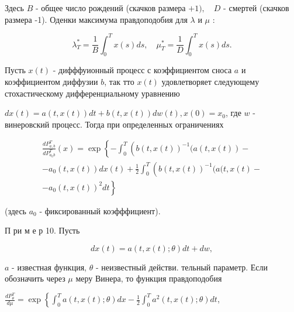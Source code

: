 \documentclass[10pt]{article}
\begin{document}
Здесь $B$ - общее число рождений (скачков размера $+1), \quad D$ - смертей (скачков размера -1). Оденки максимума правдоподобия для $\lambda$ и $\mu$ :



\[

\lambda_{T}^{*}=\frac{1}{B} \int_{0}^{T} x(s) d s, \quad \mu_{T}^{*}=\frac{1}{D} \int_{0}^{T} x(s) d s .

\]



Пусть $x(t)$ - дифффуионный процесс с коэффициентом сноса $a$ и коэффициентом диффузии $b$, так тто $x(t)$ удовлетворяет следующему стохастическому дифференциальному уравнению



$d x(t)=a(t, x(t)) d t+b(t, x(t)) d w(t), x(0)=x_{0}$, где $w$ - винеровский процесс. Тогда при определенных ограничениях



\[

\begin{gathered}

\frac{d P_{a, b}^{T}}{d P_{a_{0} b}^{T}}(x)=\exp \left\{-\int_{0}^{T}\left(b(t, x(t))^{-1}(a(t, x(t))-\right.\right. \\

-a_{0}(t, x(t)) d x(t)+\frac{1}{2} \int_{0}^{T}\left(b(t, x(t))^{-1}(a(t, x(t)-\right. \\

\left.-a_{0}(t, x(t))^{2} d t\right\}

\end{gathered}

\]



(здесь $a_{0}$ - фиксированный коэфффициент).



П ри м е р 10. Пусть



\[

d x(t)=a(t, x(t) ; \theta) d t+d w,

\]



$a$ - известная функция, $\theta$ - неизвестный действи. тельный параметр. Если обозначить через $\mu$ меру Винера, то функция правдоподобия



$\frac{d P_{\theta}^{T}}{d \mu}=\exp \left\{\int_{0}^{T} a(t, x(t) ; \theta) d x-\frac{1}{2} \int_{0}^{T} a^{2}(t, x(t) ; \theta) d t\right.$,
\end{document}
